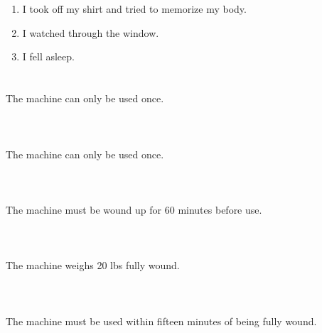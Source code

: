 \documentclass{article}
\begin{document}
    \newpage
    
    \section{}
    
    \begin{enumerate}
    
    \item I took off my shirt and tried to memorize my body.\\
    
    \item I watched through the window.\\
    
    \item I fell asleep.\\
    
    \end{enumerate}
     
    \newpage
    
    \section{}
    The machine can only be used once.\\\\ 
    \newpage
    
    \section{}
    The machine can only be used once.\\\\ 
    \newpage
    
    \section{}
    The machine must be wound up for 60 minutes before use.\\\\ 
    \newpage
    
    \section{}
    The machine weighs 20 lbs fully wound.\\\\ 
    \newpage
    
    \section{}
    The machine must be used within fifteen minutes of being fully wound.\\\\ 
    \newpage
    
\end{document}
